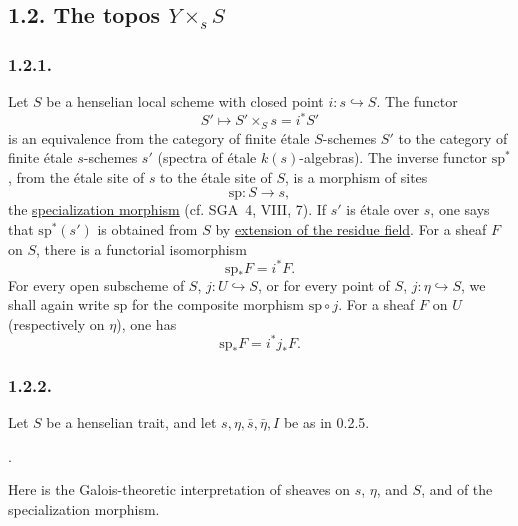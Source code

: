 \subsection*{1.2. The topos $Y\times_s S$}

\subsubsection*{1.2.1.}
Let $S$ be a henselian local scheme with closed point
$i:s\hookrightarrow S$.  The functor
\begin{equation*}
S'\longmapsto S'\times_Ss=i^*S'
\end{equation*}
is an equivalence from the category of finite \'{e}tale $S$-schemes
$S'$ to the category of finite \'{e}tale $s$-schemes $s'$ (spectra of
\'{e}tale $k(s)$-algebras).  The inverse functor $\mathrm{sp}^*$, from
the \'{e}tale site of $s$ to the \'{e}tale site of $S$, is a morphism
of sites
\begin{equation*}
\mathrm{sp}:S\longrightarrow s,
\end{equation*}
the \underline{specialization morphism} (cf. SGA~4, VIII, 7).  If
$s'$ is \'{e}tale over $s$, one says that $\mathrm{sp}^*(s')$ is
obtained from $S$ by \underline{extension of the residue field}.  For
a sheaf $F$ on $S$, there is a functorial isomorphism
\begin{equation}\tag{1.2.1.1}
\mathrm{sp}_*F=i^*F.
\end{equation}
For every open subscheme of $S$, $j:U\hookrightarrow S$, or for every
point of $S$, $j:\eta\hookrightarrow S$, we shall again write
$\mathrm{sp}$ for the composite morphism $\mathrm{sp}\circ j$.  For a
sheaf $F$ on $U$ (respectively on $\eta$), one has
\begin{equation}\tag{1.2.1.2}
\mathrm{sp}_*F=i^*j_*F.
\end{equation}

\subsubsection*{1.2.2.}
Let $S$ be a henselian trait, and let
$s,\eta,\bar s,\bar\eta,I$ be as in 0.2.5.
\begin{center}
.\end{center}
Here is the Galois-theoretic interpretation of sheaves on $s$, $\eta$,
and $S$, and of the specialization morphism.

